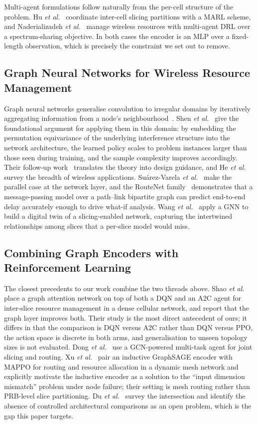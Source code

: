 \documentclass[journal]{IEEEtran}
\begin{document}
Multi-agent formulations follow naturally from the per-cell structure
of the problem. Hu \emph{et al.}~\cite{hu2022intercell} coordinate
inter-cell slicing partitions with a MARL scheme, and Naderializadeh
\emph{et al.}~\cite{naderializadeh2021marl} manage wireless resources
with multi-agent DRL over a spectrum-sharing objective. In both cases
the encoder is an MLP over a fixed-length observation, which is
precisely the constraint we set out to remove.

\subsection{Graph Neural Networks for Wireless Resource Management}
Graph neural networks generalise convolution to irregular domains by
iteratively aggregating information from a node's
neighbourhood~\cite{zhou2021gnnreview}. Shen \emph{et
al.}~\cite{shen2021gnnrrm} give the foundational argument for applying
them in this domain: by embedding the permutation equivariance of
the underlying interference structure into the network architecture,
the learned policy scales to problem instances larger than those seen
during training, and the sample complexity improves accordingly. Their
follow-up work~\cite{shen2023theory} translates the theory into design
guidance, and He \emph{et al.}~\cite{he2021gnnoverview} survey the
breadth of wireless applications. Su\'arez-Varela \emph{et
al.}~\cite{suarez2023gnncomm} make the parallel case at the network
layer, and the RouteNet family~\cite{ferriol2023routenetfermi}
demonstrates that a message-passing model over a
path--link bipartite graph can predict end-to-end delay accurately
enough to drive what-if analysis. Wang \emph{et
al.}~\cite{wang2022gnndt} apply a GNN to build a digital twin of a
slicing-enabled network, capturing the intertwined relationships among
slices that a per-slice model would miss.

\subsection{Combining Graph Encoders with Reinforcement Learning}
The closest precedents to our work combine the two threads above.
Shao \emph{et al.}~\cite{shao2021gat} place a graph attention network
on top of both a DQN and an A2C agent for inter-slice resource
management in a dense cellular network, and report that the graph layer
improves both. Their study is the most direct antecedent of ours;
it differs in that the comparison is DQN versus A2C rather than
DQN versus PPO, the action space is discrete in both arms, and
generalisation to unseen topology sizes is not evaluated. Dong \emph{et
al.}~\cite{dong2022gcnslicing} use a GCN-powered multi-task agent for
joint slicing and routing. Xu \emph{et al.}~\cite{xu2026graphsage} pair
an inductive GraphSAGE encoder with MAPPO for routing and resource
allocation in a dynamic mesh network and explicitly motivate the
inductive encoder as a solution to the ``input dimension mismatch''
problem under node failure; their setting is mesh routing rather than
PRB-level slice partitioning. Du \emph{et al.}~\cite{du2024gnnmarl}
survey the intersection and identify the absence of controlled
architectural comparisons as an open problem, which is the gap this
paper targets.
\end{document}
